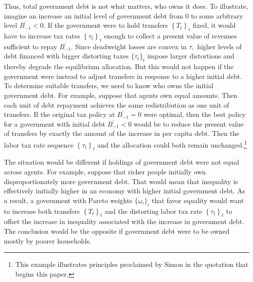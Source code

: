 \documentclass[thmsb,11pt]{article}
\begin{document}
Thus, total government debt is not what matters, who owns it does.
To  illustrate,
imagine an increase an
initial level of government debt from $0$ to some arbitrary level $%
B_{-1}^{\prime } < 0$. If the government were to hold transfers $\left\{ T_{t}\right\} _{t}$ fixed, it would
 have  to increase  tax rates $\left\{ \tau
_{t}\right\} _{t}$ enough to collect a present value of revenues sufficient to
repay $B_{-1}^{\prime }$. Since deadweight losses are convex in $\tau ,$
higher levels of debt financed with bigger distorting taxes $\{\tau_t\}_t$  impose larger
distortions and thereby degrade the equilibrium allocation.  But this would not happen  if
the government were instead  to adjust transfers in response to a higher initial debt. To determine suitable transfers, we need to
know who owns  the initial government debt. For example, suppose that agents own equal amounts. Then
each unit of debt repayment achieves the same redistribution as one
unit of transfers. If the original tax policy  at $B_{-1}^{\prime } =0 $ were optimal, then  the best policy for a government with  initial debt $%
B_{-1}^{\prime } <0 $ would be to reduce the present value of  transfers by exactly the amount of the
increase in per capita debt. Then the labor  tax rate sequence  $\left\{ \tau
_{t}\right\}_t $ and the allocation could both remain unchanged.\footnote{This example illustrates
principles proclaimed by Simon \citet[p. 85]{newcomb1865critical} in the quotation that begins
 this paper.}


The situation would be different if  holdings of government
debt were not equal across agents. For example, suppose  that  richer people initially  own disproportionately more government debt. That would mean that inequality
is  effectively initially  higher in an economy with higher initial government debt. As a result, a
government with Pareto weights $\{\omega_i\}_i$ that favor equality would want to increase both   transfers $\left\{ T_{t}\right\}_t $  and the distorting labor  tax rate $\left\{ \tau _{t}\right\}_t$
to offset the increase in inequality
associated with the increase in government debt. The conclusion would be the
opposite if government debt were to be  owned mostly by poorer
households.
\end{document}

